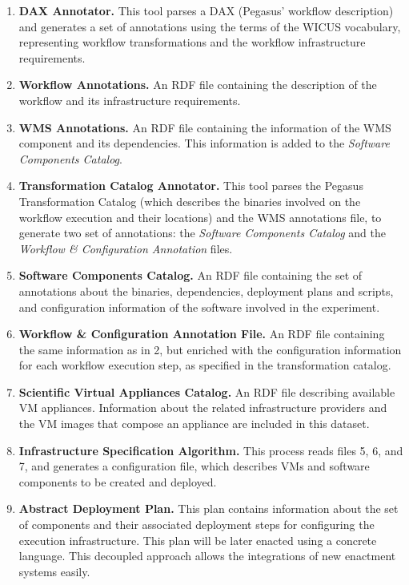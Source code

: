 \begin{enumerate}
	\item \textbf{DAX Annotator.} This tool parses a DAX (Pegasus' workflow description) 
		and generates a set of annotations using the terms of the WICUS vocabulary, 
		representing workflow transformations and the workflow infrastructure requirements.

	\item \textbf{Workflow Annotations.} An RDF file containing the description of the workflow 
		and its infrastructure requirements.

	\item \textbf{WMS Annotations.} An RDF file containing the information of the WMS component 
		and its dependencies. This information is added to the \emph{Software Components 
		Catalog}.

	\item \textbf{Transformation Catalog Annotator.} This tool parses the Pegasus Transformation 
		Catalog (which describes the binaries involved on the workflow execution and their locations) 
		and the WMS annotations file, to generate two set of annotations: the \emph{Software 
		Components Catalog} and the \emph{Workflow \& Configuration Annotation} files.

	\item \textbf{Software Components Catalog.} An RDF file containing the set of annotations about 
		the binaries, dependencies, deployment plans and scripts, and configuration information of 
		the software involved in the experiment.

	\item \textbf{Workflow \& Configuration Annotation File.} An RDF file containing the same information 
		as in 2, but enriched with the configuration information for each workflow execution step, as 
		specified in the transformation catalog.

	\item \textbf{Scientific Virtual Appliances Catalog.} An RDF file describing available VM appliances. 
		Information about the related infrastructure providers and the VM images that compose an 
		appliance are included in this dataset.

	\item \textbf{Infrastructure Specification Algorithm.} This process reads files 5, 6, and 7, and 
		generates a configuration file, which describes VMs and software 
		components to be created and deployed.

	\item \textbf{Abstract Deployment Plan.} This plan contains information about the set of components 
		and their associated deployment steps for configuring the execution infrastructure. This plan 
		will be later enacted using a concrete language. This decoupled approach allows the integrations of
		new enactment  systems easily.
		

\end{enumerate}
